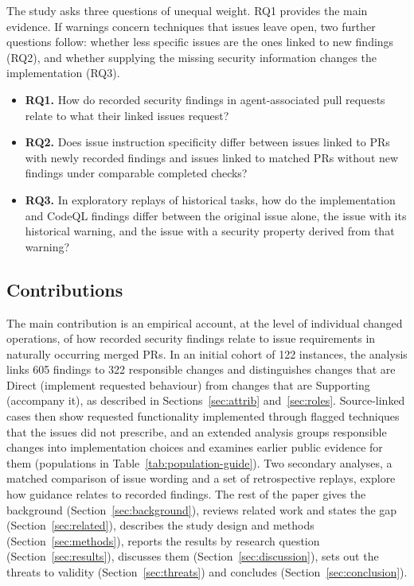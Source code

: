 \documentclass[acmsmall,screen,nonacm,review]{acmart}
\begin{document}
The study asks three questions of unequal weight. RQ1 provides the main evidence. If warnings concern techniques that issues leave open, two further questions follow: whether less specific issues are the ones linked to new findings (RQ2), and whether supplying the missing security information changes the implementation (RQ3).
\begin{itemize}
\item \textbf{RQ1.} How do recorded security findings in agent-associated pull requests relate to what their linked issues request?
\item \textbf{RQ2.} Does issue instruction specificity differ between issues linked to PRs with newly recorded findings and issues linked to matched PRs without new findings under comparable completed checks?
\item \textbf{RQ3.} In exploratory replays of historical tasks, how do the implementation and CodeQL findings differ between the original issue alone, the issue with its historical warning, and the issue with a security property derived from that warning?
\end{itemize}

\subsection{Contributions}

The main contribution is an empirical account, at the level of individual changed operations, of how recorded security findings relate to issue requirements in naturally occurring merged PRs. In an initial cohort of 122 instances, the analysis links 605 findings to 322 responsible changes and distinguishes changes that are Direct (implement requested behaviour) from changes that are Supporting (accompany it), as described in Sections~\ref{sec:attrib} and~\ref{sec:roles}. Source-linked cases then show requested functionality implemented through flagged techniques that the issues did not prescribe, and an extended analysis groups responsible changes into implementation choices and examines earlier public evidence for them (populations in Table~\ref{tab:population-guide}). Two secondary analyses, a matched comparison of issue wording and a set of retrospective replays, explore how guidance relates to recorded findings. The rest of the paper gives the background (Section~\ref{sec:background}), reviews related work and states the gap (Section~\ref{sec:related}), describes the study design and methods (Section~\ref{sec:methods}), reports the results by research question (Section~\ref{sec:results}), discusses them (Section~\ref{sec:discussion}), sets out the threats to validity (Section~\ref{sec:threats}) and concludes (Section~\ref{sec:conclusion}).
\end{document}

